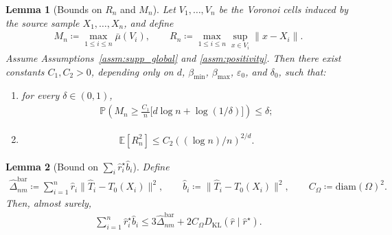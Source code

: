\documentclass[10pt,a4paper]{amsart}
\newtheorem{lemma}{Lemma}
\newcommand{\Ep}{\mathbb{E}}
\newcommand{\KL}{\mathrm{KL}}
\renewcommand{\epsilon}{\varepsilon}
\renewcommand{\hat}{\widehat}
\begin{document}
\begin{lemma}[Bounds on $R_n$ and $M_n$]
\label{lem:uot_voronoi_mass_radius}
Let $V_1,\dots,V_n$ be the Voronoi cells induced by the source sample $X_1,\dots,X_n$, and define
\begin{align*}
    M_n \coloneqq \max_{1\le i\le n} \bar\mu(V_i),
    \qquad
    R_n \coloneqq \max_{1\le i\le n}\sup_{x\in V_i}\|x-X_i\|.
\end{align*}
Assume Assumptions~\ref{assm:supp_global} and \ref{assm:positivity}. Then there exist constants $C_1,C_2>0$, depending only on $d$, $\beta_{\min}$, $\beta_{\max}$, $\epsilon_0$, and $\delta_0$, such that:
\begin{enumerate}[label=(\roman*)]
    \item for every $\delta\in(0,1)$,
    \begin{align}
\label{eq:uot_voronoi_maxmass_hp}
        \mathbb{P} \left(
            M_n
            \ge
            \frac{C_1}{n}\bigl[d\log n+\log(1/\delta)\bigr]
        \right)
        \le \delta;
    \end{align}
    \item
    \begin{align}
\label{eq:uot_voronoi_radius_moment}
        \Ep[R_n^2]
        \le
        C_2\left({(\log n)/n}\right)^{2/d}.
    \end{align}
\end{enumerate}
\end{lemma}

\begin{lemma}[Bound on $\sum_i\hat r_i^\star\hat b_i$]
\label{lem:uot_weighted_pinsker_rows_hat}
Define
\begin{align*}
    \hat\Delta_{nm}^{\mathrm{bar}}
    \coloneqq
    \sum_{i=1}^n \hat r_i \|\hat T_i-T_0(X_i)\|^2,
    \qquad
    \hat b_i \coloneqq \|\hat T_i-T_0(X_i)\|^2,
    \qquad
    C_\Omega \coloneqq \mathrm{diam}(\Omega)^2.
\end{align*}
Then, almost surely,
\begin{align}
    \sum_{i=1}^n \hat r_i^\star \hat b_i
    \le
    3\hat\Delta_{nm}^{\mathrm{bar}}
    + 2C_\Omega {D_\KL}(\hat r\mid \hat r^\star).
\end{align}
\end{lemma}
\end{document}
